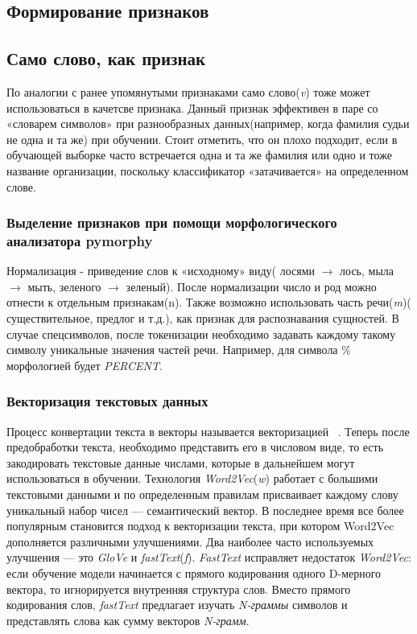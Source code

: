 \documentclass{csmathnotes}
\begin{document}
\subsection*{Формирование признаков}
\subsection*{Само слово, как признак}
По аналогии с ранее упомянутыми признаками само слово(\emph{v}) тоже может использоваться в качетсве признака. Данный признак эффективен в паре со «словарем символов» при разнообразных данных(например, когда фамилия судьи не одна и та же) при обучении. Стоит отметить, что он плохо подходит, если в обучающей выборке часто встречается одна и та же фамилия или одно и тоже название организации, поскольку классификатор «затачивается» на определенном слове.
\subsubsection*{Выделение признаков при помощи морфологического анализатора pymorphy}
Нормализация - приведение слов к «исходному» виду( лосями $\rightarrow$  лось, мыла $\rightarrow$ мыть, зеленого $\rightarrow$ зеленый). После нормализации число и род  можно отнести к отдельным признакам(n). Также возможно использовать часть речи(\emph{m})( существительное, предлог и т.д.), как признак для распознавания сущностей. В случае спецсимволов, после токенизации необходимо задавать каждому такому символу уникальные значения частей речи. Например, для символа \% морфологией будет \emph{PERCENT}.

 
\subsubsection*{Векторизация текстовых данных}
Процесс конвертации текста в векторы называется векторизацией~\cite{w2v} . Теперь после предобработки текста, необходимо представить его в числовом виде, то есть закодировать текстовые данные числами, которые в дальнейшем могут использоваться в обучении. Технология \emph{Word2Vec}(\emph{w}) работает с большими текстовыми данными и по определенным правилам присваивает каждому слову уникальный набор чисел — семантический вектор. В последнее время все более популярным становится подход к векторизации текста, при котором Word2Vec дополняется различными улучшениями. Два наиболее часто используемых улучшения — это \emph{GloVe} и \emph{fastText}(\emph{f}). \emph{FastText} исправляет недостаток \emph{Word2Vec}: если обучение модели начинается с прямого кодирования одного D-мерного вектора, то игнорируется внутренняя структура слов. Вместо прямого кодирования слов, \emph{fastText} предлагает изучать \emph{N-граммы} символов и представлять слова как сумму векторов \emph{N-грамм}.
\end{document}
